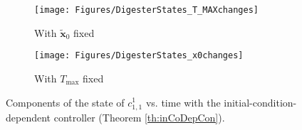 \documentclass[lettersize,journal]{IEEEtran}
\begin{document}
\begin{figure}
\begin{subfigure}{.24\textwidth}
  \centering
  \texttt{[image: Figures/DigesterStates\_T\_MAXchanges]}
  \caption{With $\tilde{\bm{x}}_0$ fixed}
  \label{fig:DigesterStates_T_MAXchanges}
\end{subfigure}%
\begin{subfigure}{.24\textwidth}
  \centering
  \texttt{[image: Figures/DigesterStates\_x0changes]}
  \caption{With $T_{\text{max}}$ fixed}
  \label{fig:DigesterStates_x0changes}
\end{subfigure}
\caption{Components of the state of $c^1_{1,1}$ vs. time with the initial-condition-dependent controller (Theorem \ref{th:inCoDepCon}).}
\label{fig:DigesterStates}
\end{figure}
    
\end{document}
